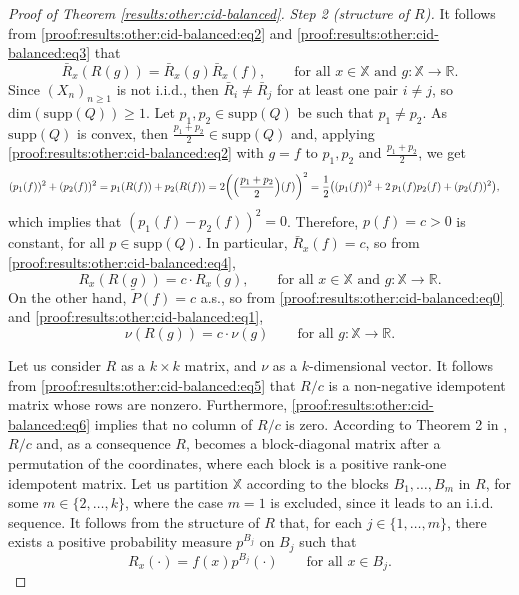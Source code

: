 \documentclass[a4paper]{article}
\theoremstyle{plain}
\theoremstyle{remark}
\theoremstyle{definition}
\begin{document}
\begin{proof}[Proof of Theorem \ref{results:other:cid-balanced}]
\noindent\textit{Step 2 (structure of $R$).}
It follows from \eqref{proof:results:other:cid-balanced:eq2} and \eqref{proof:results:other:cid-balanced:eq3} that
\begin{equation}\label{proof:results:other:cid-balanced:eq4}
\bar{R}_x(R(g))=\bar{R}_x(g)\bar{R}_x(f),\qquad\mbox{for all }x\in\mathbb{X}\mbox{ and }g:\mathbb{X}\rightarrow\mathbb{R}.
\end{equation}
Since $(X_n)_{n\geq1}$ is not i.i.d., then $\bar{R}_i\neq\bar{R}_j$ for at least one pair $i\neq j$, so $\mbox{dim}(\mbox{supp}(Q))\geq1$. Let $p_1,p_2\in\mbox{supp}(Q)$ be such that $p_1\neq p_2$. As $\mbox{supp}(Q)$ is convex, then $\frac{p_1+p_2}{2}\in\mbox{supp}(Q)$ and, applying \eqref{proof:results:other:cid-balanced:eq2} with $g=f$ to $p_1,p_2$ and $\frac{p_1+p_2}{2}$, we get
\begingroup\allowdisplaybreaks
\begin{align*}
(p_1(f))^2+(p_2(f))^2&=p_1(R(f))+p_2(R(f))=2\biggl(\Bigl(\frac{p_1+p_2}{2}\Bigr)(f)\biggr)^2=\frac{1}{2}\bigl((p_1(f))^2+2\,p_1(f)p_2(f)+(p_2(f))^2\bigr),
\end{align*}
\endgroup
which implies that $(p_1(f)-p_2(f))^2=0$. Therefore, $p(f)=c>0$ is constant, for all $p\in\mbox{supp}(Q)$. In particular, $\bar{R}_x(f)=c$, so from \eqref{proof:results:other:cid-balanced:eq4},
\begin{equation}\label{proof:results:other:cid-balanced:eq5}
R_x(R(g))=c\cdot R_x(g),\qquad\mbox{for all }x\in\mathbb{X}\mbox{ and }g:\mathbb{X}\rightarrow\mathbb{R}.
\end{equation}
On the other hand, $\tilde{P}(f)=c$ a.s., so from \eqref{proof:results:other:cid-balanced:eq0} and \eqref{proof:results:other:cid-balanced:eq1},
\begin{equation}\label{proof:results:other:cid-balanced:eq6}
\nu(R(g))=c\cdot\nu(g)\qquad\mbox{for all }g:\mathbb{X}\rightarrow\mathbb{R}.
\end{equation}

Let us consider $R$ as a $k\times k$ matrix, and $\nu$ as a $k$-dimensional vector. It follows from \eqref{proof:results:other:cid-balanced:eq5} that $R/c$ is a non-negative idempotent matrix whose rows are nonzero. Furthermore, \eqref{proof:results:other:cid-balanced:eq6} implies that no column of $R/c$ is zero. According to Theorem 2 in \cite{flor1969}, $R/c$ and, as a consequence $R$, becomes a block-diagonal matrix after a permutation of the coordinates, where each block is a positive rank-one idempotent matrix. Let us partition $\mathbb{X}$ according to the blocks $B_1,\ldots,B_m$ in $R$, for some $m\in\{2,\ldots,k\}$, where the case $m=1$ is excluded, since it leads to an i.i.d. sequence. It follows from the structure of $R$ that, for each $j\in\{1,\ldots,m\}$, there exists a positive probability measure $p^{B_j}$ on $B_j$ such that
\begin{equation}\label{proof:results:other:cid-balanced:eq7}
R_x(\cdot)=f(x)p^{B_j}(\cdot)\qquad\mbox{for all }x\in B_j.
\end{equation}


\end{proof}
\end{document}
